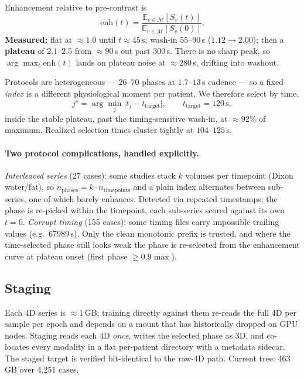 \documentclass[11pt]{article}
\newcommand{\roi}{\mathcal{M}}
\newcommand{\Ex}{\mathbb{E}}
\newcommand{\1}{\mathbb{1}}
\begin{document}
Enhancement relative to pre-contrast is
\begin{equation}
\text{enh}(t)=\frac{\Ex_{v\in\roi}[S_v(t)]}{\Ex_{v\in\roi}[S_v(0)]}.
\end{equation}
\textbf{Measured:} flat at $\approx1.0$ until $t\approx45$\,s; wash-in $55$--$90$\,s
($1.12\to2.00$); then a \textbf{plateau} of $2.1$--$2.5$ from $\approx90$\,s out past
$300$\,s. There is no sharp peak, so $\arg\max_t\text{enh}(t)$ lands on plateau noise at
$\approx280$\,s, drifting into washout.

Protocols are heterogeneous --- $26$--$70$ phases at $1.7$--$13$\,s cadence --- so a fixed
\emph{index} is a different physiological moment per patient. We therefore select by time,
\begin{equation}
j^\star=\arg\min_j\bigl|t_j-t_{\text{target}}\bigr|,\qquad t_{\text{target}}=120\,\text{s},
\end{equation}
inside the stable plateau, past the timing-sensitive wash-in, at $\approx92\%$ of maximum.
Realized selection times cluster tightly at $104$--$125$\,s.

\paragraph{Two protocol complications, handled explicitly.}
\emph{Interleaved series} (27 cases): some studies stack $k$ volumes per timepoint (Dixon
water/fat), so $n_{\text{phases}}=k\cdot n_{\text{timepoints}}$ and a plain index alternates
between sub-series, one of which barely enhances. Detected via repeated timestamps; the
phase is re-picked within the timepoint, each sub-series scored against its own $t{=}0$.
\emph{Corrupt timing} (155 cases): some timing files carry impossible trailing values
(e.g.\ 67989\,s). Only the clean monotonic prefix is trusted, and where the time-selected
phase still looks weak the phase is re-selected from the enhancement curve at plateau onset
(first phase $\ge0.9\max$).

\subsection{Staging}

Each 4D series is $\approx1$\,GB; training directly against them re-reads the full 4D per
sample per epoch and depends on a mount that has historically dropped on GPU nodes. Staging
reads each 4D \emph{once}, writes the selected phase as 3D, and co-locates every modality in
a flat per-patient directory with a metadata sidecar. The staged target is verified
bit-identical to the raw-4D path. Current tree: 463\,GB over 4{,}251 cases.
\end{document}

